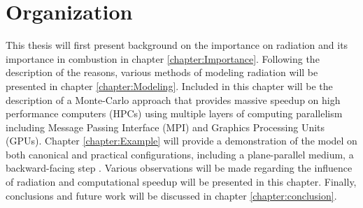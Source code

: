 \section{Organization}
This thesis will first present background on the importance on radiation and its importance in combustion in chapter \ref{chapter:Importance}. 
Following the description of the reasons, various methods of modeling radiation will be presented in chapter \ref{chapter:Modeling}. Included in this chapter will be the description of a Monte-Carlo approach that provides massive speedup on high performance computers (HPCs) using multiple layers of computing parallelism including Message Passing Interface (MPI) and Graphics Processing Units (GPUs).
Chapter \ref{chapter:Example} will provide a demonstration of the model on both canonical and practical configurations, including a plane-parallel medium, a backward-facing step . Various observations will be made regarding the influence of radiation and computational speedup will be presented in this chapter.
Finally, conclusions and future work will be discussed in chapter \ref{chapter:conclusion}.
